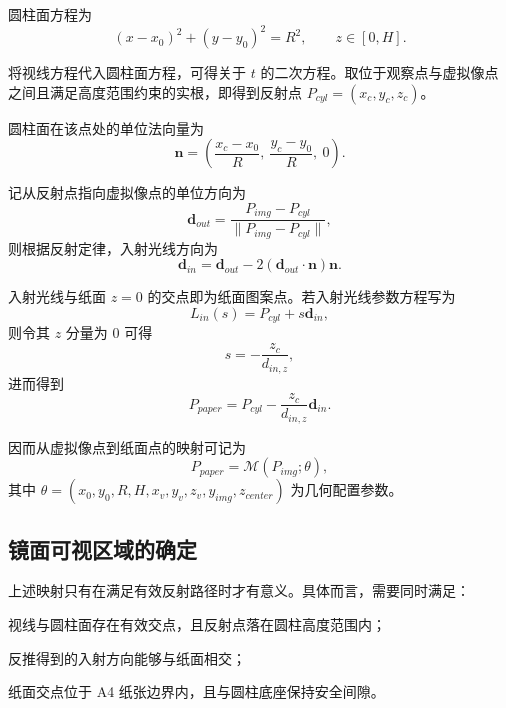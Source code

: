 \documentclass[a4paper,12pt]{ctexart}
\begin{document}
\par 圆柱面方程为
\begin{equation}
(x-x_0)^2+(y-y_0)^2=R^2,\qquad z\in[0,H].
\end{equation}

\par 将视线方程代入圆柱面方程，可得关于 $t$ 的二次方程。取位于观察点与虚拟像点之间且满足高度范围约束的实根，即得到反射点 $P_{cyl}=(x_c,y_c,z_c)$。

\par 圆柱面在该点处的单位法向量为
\begin{equation}
\mathbf{n}=\left(\frac{x_c-x_0}{R},\ \frac{y_c-y_0}{R},\ 0\right).
\end{equation}

\par 记从反射点指向虚拟像点的单位方向为
\begin{equation}
\mathbf{d}_{out}=\frac{P_{img}-P_{cyl}}{\|P_{img}-P_{cyl}\|},
\end{equation}
则根据反射定律，入射光线方向为
\begin{equation}
\mathbf{d}_{in}=\mathbf{d}_{out}-2(\mathbf{d}_{out}\cdot\mathbf{n})\mathbf{n}.
\end{equation}

\par 入射光线与纸面 $z=0$ 的交点即为纸面图案点。若入射光线参数方程写为
\begin{equation}
L_{in}(s)=P_{cyl}+s\mathbf{d}_{in},
\end{equation}
则令其 $z$ 分量为 $0$ 可得
\begin{equation}
s=-\frac{z_c}{d_{in,z}},
\end{equation}
进而得到
\begin{equation}
P_{paper}=P_{cyl}-\frac{z_c}{d_{in,z}}\mathbf{d}_{in}.
\end{equation}

\par 因而从虚拟像点到纸面点的映射可记为
\begin{equation}
P_{paper}=\mathcal{M}(P_{img};\theta),
\end{equation}
其中 $\theta=(x_0,y_0,R,H,x_v,y_v,z_v,y_{img},z_{center})$ 为几何配置参数。

\subsection{镜面可视区域的确定}
\par 上述映射只有在满足有效反射路径时才有意义。具体而言，需要同时满足：
\begin{compactitem}
\item 视线与圆柱面存在有效交点，且反射点落在圆柱高度范围内；
\item 反推得到的入射方向能够与纸面相交；
\item 纸面交点位于 A4 纸张边界内，且与圆柱底座保持安全间隙。
\end{compactitem}
\end{document}

